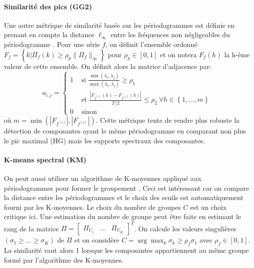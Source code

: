 \documentclass{gretsi}
\newcommand{\val}[3]{(#1_1 #3 \dots #3 #1_#2)}
\newcommand{\set}[1]{\left \{ 1, \dots, #1 \right \}}
\newcommand{\inter}{\left[0, 1\right]}
\begin{document}
\paragraph{Similarité des pics (GG2)}\label{par:GG2}
    Une autre métrique de similarité basée sur les périodogrammes est définie en prenant en compte la distance $\ell_\infty$ entre les fréquences non négligeables du périodogramme \cite{abalov_14_auto}.
    Pour une série $f$, on définit l'ensemble ordonné $F_f = \left \{ k | \Pi_f(k) \ge \rho_p \|\Pi_f\|_\infty \right \}$ pour $\rho_p \in \inter$ et on notera $F_f(h)$ la h-ème valeur de cette ensemble.
    On définit alors la matrice d'adjacence par:
    \begin{equation*}
        a_{i, j} = 
        \begin{cases}
	        1 & \text{ si } \displaystyle\frac{\min(\lambda_i, \lambda_j)}{\max(\lambda_i, \lambda_j)} \ge \rho_1\\
	          & \text{ et } \frac{|F_{f^{(i)}}(h) - F_{f^{(j)}}(h)|}{T/2} \le \rho_2\ \forall h \in \set{m}\\
	        0 & \text{ sinon}
        \end{cases}
    \end{equation*} 
    où $m = \min\left(\left|F_{f^{(i)}}\right|, \left|F_{f^{(j)}}\right|\right)$.
    Cette métrique tente de rendre plus robuste la détection de composantes ayant le même périodogramme en comparant non plus le pic maximal (HG) mais les supports spectraux des composantes. 


\paragraph{K-means spectral (KM)}\label{par:KM} 
    On peut aussi utiliser un algorithme de K-moyennes appliqué aux périodogrammes pour former le groupement \cite{alvarez_13_auto}.
    Ceci est intéressant car on compare la distance entre les périodogrammes et le choix des seuils est automatiquement fourni par les K-moyennes.
    Le choix du nombre de groupes $C$ est un choix critique ici.
    Une estimation du nombre de groupe peut être faite en estimant le rang de la matrice $\Pi = \begin{bmatrix}\Pi_{U_1}&\dots&\Pi_{U_K}\end{bmatrix}^T$.
    On calcule les valeurs singulières $\val{\sigma}{K}{\ge}$ de $\Pi$ et on considère $C = \arg\max_k \sigma_k \ge \rho_f \sigma_1$ avec $\rho_f \in \inter$.
    La similarité vaut alors 1 lorsque les composantes appartiennent au même groupe formé par l'algorithme des K-moyennes.
\end{document}
